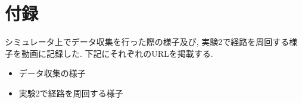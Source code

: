 \chapter*{付録}
シミュレータ上でデータ収集を行った際の様子及び, 実験2で経路を周回する様子を動画に記録した. 下記にそれぞれのURLを掲載する.
\begin{itemize}
  \item データ収集の様子
  \item 実験2で経路を周回する様子
\end{itemize}
